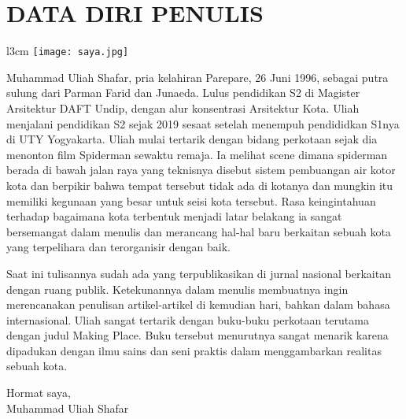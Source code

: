 \documentclass[../main.tex]{subfiles}
\begin{document}
\chapter*{DATA DIRI PENULIS}

\begin{wrapfigure}[7]{l}{3cm}
\centering
    \texttt{[image: saya.jpg]}
\end{wrapfigure}

\noindent Muhammad Uliah Shafar, pria kelahiran Parepare, 26 Juni 1996, sebagai putra sulung dari Parman Farid dan Junaeda. Lulus pendidikan S2 di Magister Arsitektur DAFT Undip, dengan alur konsentrasi Arsitektur Kota. Uliah menjalani pendidikan S2 sejak 2019 sesaat setelah menempuh pendididkan S1nya di UTY Yogyakarta.
Uliah mulai tertarik dengan bidang perkotaan sejak dia menonton film Spiderman sewaktu remaja. Ia melihat scene dimana spiderman berada di bawah jalan raya yang teknisnya disebut sistem pembuangan air kotor kota dan berpikir bahwa tempat tersebut tidak ada di kotanya dan mungkin itu memiliki kegunaan yang besar untuk seisi kota tersebut. Rasa keingintahuan terhadap bagaimana kota terbentuk menjadi latar belakang ia sangat bersemangat dalam menulis dan merancang hal-hal baru berkaitan sebuah kota yang terpelihara dan terorganisir dengan baik.

Saat ini tulisannya sudah ada yang terpublikasikan di jurnal nasional berkaitan dengan ruang publik. Ketekunannya dalam menulis membuatnya ingin merencanakan penulisan artikel-artikel di kemudian hari, bahkan dalam bahasa internasional. Uliah sangat tertarik dengan buku-buku perkotaan terutama dengan judul Making Place. Buku tersebut menurutnya sangat menarik karena dipadukan dengan ilmu sains dan seni praktis dalam menggambarkan realitas sebuah kota.

\vspace{2\baselineskip}
\begin{flushright}
    Hormat saya,\\ Muhammad Uliah Shafar
\end{flushright}


\end{document}

